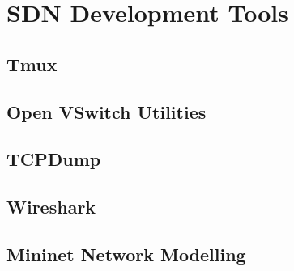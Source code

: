 \chapter{SDN Development Tools}

\section{Tmux}

\section{Open VSwitch Utilities}

\section{TCPDump}
 \label{sdn_development_tools:tcpdump}

\section{Wireshark}

\section{Mininet Network Modelling}

